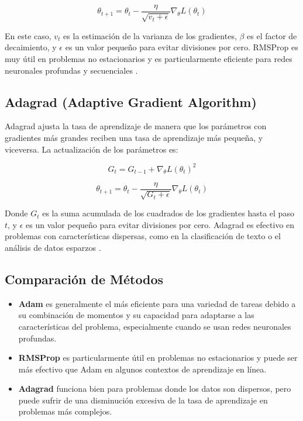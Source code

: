 \documentclass[12pt]{article}
\begin{document}
	\begin{equation}
		\theta_{t+1} = \theta_t - \frac{\eta}{\sqrt{v_t + \epsilon}} \nabla_{\theta} L(\theta_t)
	\end{equation}
	
	En este caso, \( v_t \) es la estimación de la varianza de los gradientes, \( \beta \) es el factor de decaimiento, y \( \epsilon \) es un valor pequeño para evitar divisiones por cero. RMSProp es muy útil en problemas no estacionarios y es particularmente eficiente para redes neuronales profundas y secuenciales \cite{Hinton2012}.
	
	\subsection*{Adagrad (Adaptive Gradient Algorithm)}
	
	Adagrad ajusta la tasa de aprendizaje de manera que los parámetros con gradientes más grandes reciben una tasa de aprendizaje más pequeña, y viceversa. La actualización de los parámetros es:
	
	\begin{equation}
		G_t = G_{t-1} + \nabla_{\theta} L(\theta_t)^2
	\end{equation}
	
	\begin{equation}
		\theta_{t+1} = \theta_t - \frac{\eta}{\sqrt{G_t + \epsilon}} \nabla_{\theta} L(\theta_t)
	\end{equation}
	
	Donde \( G_t \) es la suma acumulada de los cuadrados de los gradientes hasta el paso \( t \), y \( \epsilon \) es un valor pequeño para evitar divisiones por cero. Adagrad es efectivo en problemas con características dispersas, como en la clasificación de texto o el análisis de datos esparzos \cite{Duchi2011}.
	
	\subsection*{Comparación de Métodos}
	
	\begin{itemize}
		\item \textbf{Adam} es generalmente el más eficiente para una variedad de tareas debido a su combinación de momentos y su capacidad para adaptarse a las características del problema, especialmente cuando se usan redes neuronales profundas.
		\item \textbf{RMSProp} es particularmente útil en problemas no estacionarios y puede ser más efectivo que Adam en algunos contextos de aprendizaje en línea.
		\item \textbf{Adagrad} funciona bien para problemas donde los datos son dispersos, pero puede sufrir de una disminución excesiva de la tasa de aprendizaje en problemas más complejos.
	\end{itemize}
	
\end{document}
